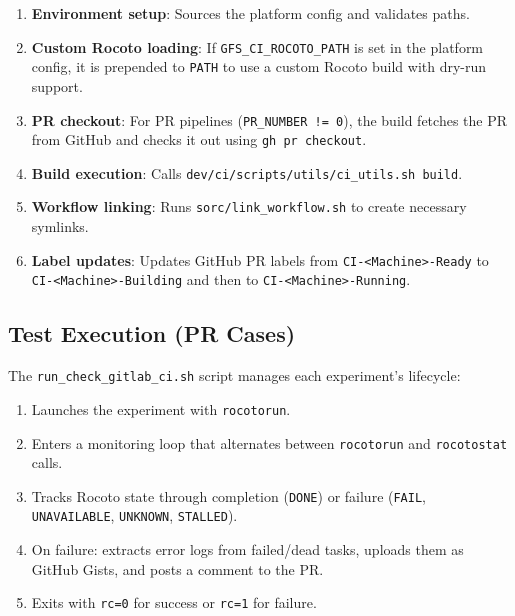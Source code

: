 \documentclass[11pt,letterpaper,twoside]{article}
\begin{document}
\begin{enumerate}[leftmargin=1.5em]
  \item \textbf{Environment setup}: Sources the platform config and validates
    paths.
  \item \textbf{Custom Rocoto loading}: If \texttt{GFS\_CI\_ROCOTO\_PATH} is set
    in the platform config, it is prepended to \texttt{PATH} to use a custom
    Rocoto build with dry-run support.
  \item \textbf{PR checkout}: For PR pipelines
    (\texttt{PR\_NUMBER\,!=\,0}), the build fetches the PR from GitHub and
    checks it out using \texttt{gh pr checkout}.
  \item \textbf{Build execution}: Calls
    \texttt{dev/ci/scripts/utils/ci\_utils.sh build}.
  \item \textbf{Workflow linking}: Runs \texttt{sorc/link\_workflow.sh} to
    create necessary symlinks.
  \item \textbf{Label updates}: Updates GitHub PR labels from
    \texttt{CI-<Machine>-Ready} to \texttt{CI-<Machine>-\allowbreak{}Building}
    and then to \texttt{CI-<Machine>-Running}.
\end{enumerate}

\subsection{Test Execution (PR Cases)}
\label{sec:test-pr}

The \texttt{run\_check\_gitlab\_ci.sh} script manages each experiment's
lifecycle:

\begin{enumerate}[leftmargin=1.5em]
  \item Launches the experiment with \texttt{rocotorun}.
  \item Enters a monitoring loop that alternates between \texttt{rocotorun}
    and \texttt{rocotostat} calls.
  \item Tracks Rocoto state through completion (\texttt{DONE}) or failure
    (\texttt{FAIL}, \texttt{UNAVAILABLE}, \texttt{UNKNOWN},
    \texttt{STALLED}).
  \item On failure: extracts error logs from failed/dead tasks, uploads them as
    GitHub Gists, and posts a comment to the PR.
  \item Exits with \texttt{rc=0} for success or \texttt{rc=1} for failure.
\end{enumerate}
\end{document}
